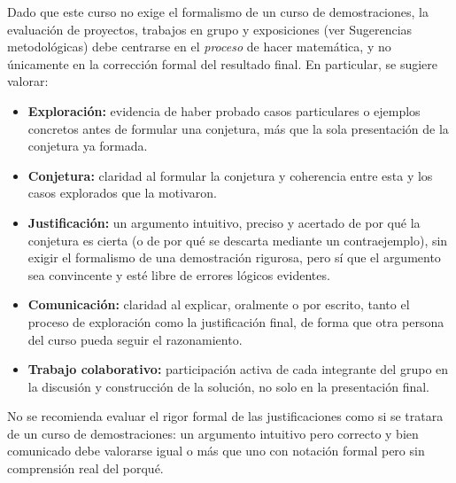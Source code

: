 \begin{refsection}
Dado que este curso no exige el formalismo de un curso de
demostraciones, la evaluación de proyectos, trabajos en grupo y
exposiciones (ver Sugerencias metodológicas) debe centrarse en el
\emph{proceso} de hacer matemática, y no únicamente en la corrección
formal del resultado final. En particular, se sugiere valorar:

\begin{itemize}
  \item \textbf{Exploración:} evidencia de haber probado casos
    particulares o ejemplos concretos antes de formular una
    conjetura, más que la sola presentación de la conjetura ya
    formada.
  \item \textbf{Conjetura:} claridad al formular la conjetura y
    coherencia entre esta y los casos explorados que la motivaron.
  \item \textbf{Justificación:} un argumento intuitivo, preciso y
    acertado de por qué la conjetura es cierta (o de por qué se
    descarta mediante un contraejemplo), sin exigir el formalismo de
    una demostración rigurosa, pero sí que el argumento sea
    convincente y esté libre de errores lógicos evidentes.
  \item \textbf{Comunicación:} claridad al explicar, oralmente o por
    escrito, tanto el proceso de exploración como la justificación
    final, de forma que otra persona del curso pueda seguir el
    razonamiento.
  \item \textbf{Trabajo colaborativo:} participación activa de cada
    integrante del grupo en la discusión y construcción de la
    solución, no solo en la presentación final.
\end{itemize}

No se recomienda evaluar el rigor formal de las justificaciones como
si se tratara de un curso de demostraciones: un argumento intuitivo
pero correcto y bien comunicado debe valorarse igual o más que uno
con notación formal pero sin comprensión real del porqué.


\nocite{Eng93}
\nocite{Gri18}
\nocite{MS17}
\nocite{Pol14}
\nocite{RT94}
\nocite{Sti22}
\nocite{Tal13}


\printcursosbibliography
\end{refsection}

